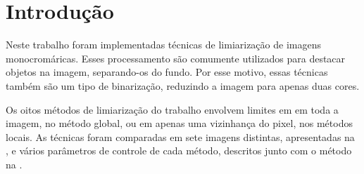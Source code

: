 \section{Introdução} \label{sec:intro}

Neste trabalho foram implementadas técnicas de limiarização de imagens monocromáricas. Esses processamento são comumente utilizados para destacar objetos na imagem, separando-os do fundo. Por esse motivo, essas técnicas também são um tipo de binarização, reduzindo a imagem para apenas duas cores.

Os oitos métodos de limiarização do trabalho envolvem limites em em toda a imagem, no método global, ou em apenas uma vizinhança do pixel, nos métodos locais. As técnicas foram comparadas em sete imagens distintas, apresentadas na , e vários parâmetros de controle de cada método, descritos junto com o método na .
